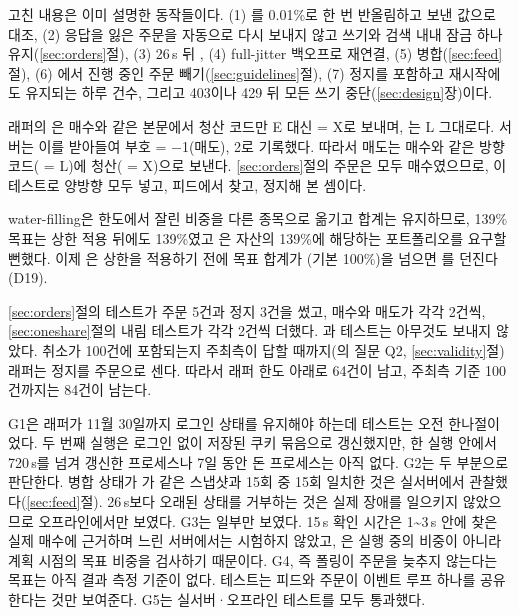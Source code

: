 

 고친 내용은 이미 설명한 동작들이다. (1) 를 0.01\%로 한 번 반올림하고 보낸 값으로 대조, (2) 응답을 잃은 주문을 자동으로 다시 보내지 않고 쓰기와 검색 내내 잠금 하나 유지(\ref{sec:orders}절), (3) 26\,s 뒤 , (4) full-jitter 백오프로 재연결, (5)  병합(\ref{sec:feed}절), (6) 에서 진행 중인 주문 빼기(\ref{sec:guidelines}절), (7) 정지를 포함하고 재시작에도 유지되는 하루 건수, 그리고 403이나 429 뒤 모든 쓰기 중단(\ref{sec:design}장)이다.

 래퍼의 은 매수와 같은  본문에서 청산 코드만 E 대신  = X로 보내며, 는 L 그대로다. 서버는 이를 받아들여 부호  = −1(매도),  2로 기록했다. 따라서 매도는 매수와 같은 방향 코드( = L)에 청산( = X)으로 보낸다. \ref{sec:orders}절의 주문은 모두 매수였으므로, 이 테스트로 양방향 모두 넣고, 피드에서 찾고, 정지해 본 셈이다.

 water-filling은 한도에서 잘린 비중을 다른 종목으로 옮기고 합계는 유지하므로, 139\% 목표는 상한 적용 뒤에도 139\%였고 은 자산의 139\%에 해당하는 포트폴리오를 요구할 뻔했다. 이제 은 상한을 적용하기 전에 목표 합계가 (기본 100\%)을 넘으면 를 던진다(D19).

 \ref{sec:orders}절의 테스트가 주문 5건과 정지 3건을 썼고, 매수와 매도가 각각 2건씩, \ref{sec:oneshare}절의 내림 테스트가 각각 2건씩 더했다. 과  테스트는 아무것도 보내지 않았다. 취소가 100건에 포함되는지 주최측이 답할 때까지(의 질문 Q2, \ref{sec:validity}절) 래퍼는 정지를 주문으로 센다. 따라서 래퍼 한도 아래로 64건이 남고, 주최측 기준 100건까지는 84건이 남는다.

 G1은 래퍼가 11월 30일까지 로그인 상태를 유지해야 하는데 테스트는 오전 한나절이었다. 두 번째 실행은 로그인 없이 저장된 쿠키 묶음으로 갱신했지만, 한 실행 안에서 720\,s를 넘겨 갱신한 프로세스나 7일 동안 돈 프로세스는 아직 없다. G2는 두 부분으로 판단한다. 병합 상태가 가 같은 스냅샷과 15회 중 15회 일치한 것은 실서버에서 관찰했다(\ref{sec:feed}절). 26\,s보다 오래된 상태를 거부하는 것은 실제 장애를 일으키지 않았으므로 오프라인에서만 보였다. G3는 일부만 보였다. 15\,s 확인 시간은 1\textasciitilde 3\,s 안에 찾은 실제 매수에 근거하며 느린 서버에서는 시험하지 않았고, 은 실행 중의 비중이 아니라 계획 시점의 목표 비중을 검사하기 때문이다. G4, 즉 폴링이 주문을 늦추지 않는다는 목표는 아직 결과 측정 기준이 없다. 테스트는 피드와 주문이 이벤트 루프 하나를 공유한다는 것만 보여준다. G5는 실서버·오프라인 테스트를 모두 통과했다.



